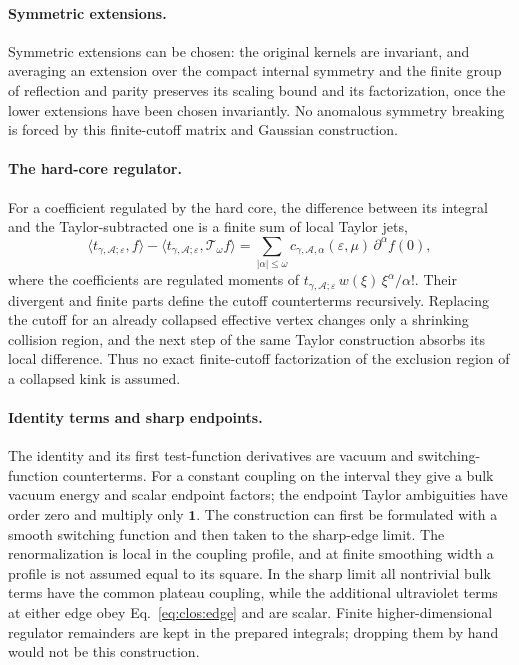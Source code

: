 \documentclass[11pt,a4paper]{article}
\numberwithin{equation}{section}
\begin{document}
\paragraph{Symmetric extensions.} Symmetric extensions can be chosen: the original kernels are invariant, and averaging
an extension over the compact internal symmetry and the finite group of reflection and parity preserves its scaling
bound and its factorization, once the lower extensions have been chosen invariantly. No anomalous symmetry breaking is
forced by this finite-cutoff matrix and Gaussian construction.

\paragraph{The hard-core regulator.} For a coefficient regulated by the hard core, the difference between its integral
and the Taylor-subtracted one is a finite sum of local Taylor jets,
\begin{equation}
 \langle t_{\gamma,\mathcal A;\varepsilon},f\rangle-\langle t_{\gamma,\mathcal A;\varepsilon},\mathcal T_\omega f\rangle
 =\sum_{|\alpha|\le\omega}c_{\gamma,\mathcal A,\alpha}(\varepsilon,\mu)\,\partial^\alpha f(0),
 \label{eq:clos:cutoffdiff}
\end{equation}
where the coefficients are regulated moments of $t_{\gamma,\mathcal A;\varepsilon}\,w(\xi)\,\xi^\alpha/\alpha!$. Their
divergent and finite parts define the cutoff counterterms recursively. Replacing the cutoff for an already collapsed
effective vertex changes only a shrinking collision region, and the next step of the same Taylor construction absorbs
its local difference. Thus no exact finite-cutoff factorization of the exclusion region of a collapsed kink is assumed.

\paragraph{Identity terms and sharp endpoints.} The identity and its first test-function derivatives are vacuum and
switching-function counterterms. For a constant coupling on the interval they give a bulk vacuum energy and scalar
endpoint factors; the endpoint Taylor ambiguities have order zero and multiply only $\mathbf 1$. The construction can
first be formulated with a smooth switching function and then taken to the sharp-edge limit. The renormalization is
local in the coupling profile, and at finite smoothing width a profile is not assumed equal to its square. In the sharp
limit all nontrivial bulk terms have the common plateau coupling, while the additional ultraviolet terms at either
edge obey Eq.~\eqref{eq:clos:edge} and are scalar. Finite higher-dimensional regulator remainders are kept in the
prepared integrals; dropping them by hand would not be this construction.
\end{document}
